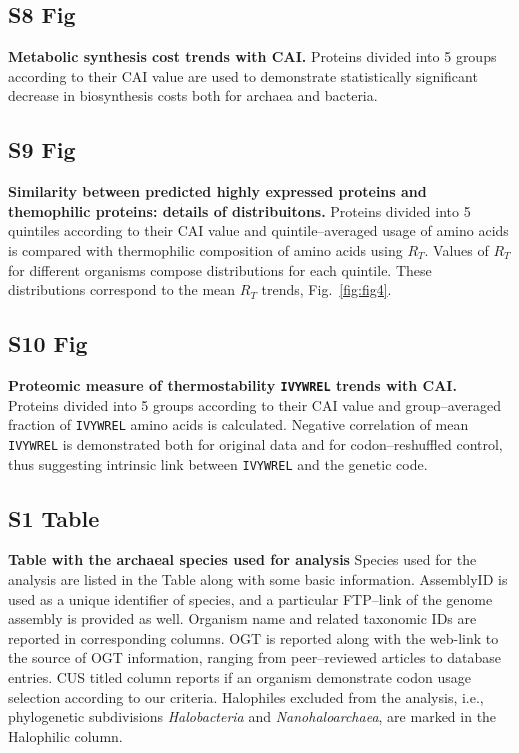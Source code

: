 \documentclass[10pt,letterpaper]{article}
\begin{document}
\subsection*{S8 Fig}
\label{fig:s8}
{\bf Metabolic synthesis cost trends with CAI.}
Proteins divided into 5 groups according to their CAI value are used to demonstrate statistically significant decrease in biosynthesis costs both for archaea and bacteria.


\subsection*{S9 Fig}
\label{fig:s9}
{\bf Similarity between predicted highly expressed proteins and themophilic proteins: details of distribuitons.}
Proteins divided into 5 quintiles according to their CAI value and quintile--averaged usage of amino acids is compared with thermophilic composition of amino acids using $R_T$. Values of $R_T$ for different organisms compose distributions for each quintile. These distributions correspond to the mean $R_T$ trends, Fig.~\ref{fig:fig4}.



\subsection*{S10 Fig}
\label{fig:s10}
{\bf Proteomic measure of thermostability \texttt{IVYWREL} trends with CAI.}
Proteins divided into 5 groups according to their CAI value and group--averaged fraction of \texttt{IVYWREL} amino acids is calculated. Negative correlation of mean \texttt{IVYWREL} is demonstrated both for original data and for codon--reshuffled control, thus suggesting intrinsic link between \texttt{IVYWREL} and the genetic code.


\subsection*{S1 Table}
\label{table:s1}
{\bf Table with the archaeal species used for analysis}
Species used for the analysis are listed in the Table along with some basic information.
AssemblyID is used as a unique identifier of species, and a particular FTP--link of the genome assembly is provided as well.
Organism name and related taxonomic IDs are reported in corresponding columns. OGT is reported along with the web-link to the source of OGT information, ranging from peer--reviewed articles to database entries. CUS titled column reports if an organism demonstrate codon usage selection according to our criteria. Halophiles excluded from the analysis, i.e., phylogenetic subdivisions {\it Halobacteria} and {\it Nanohaloarchaea}, are marked in the Halophilic column.
\end{document}
